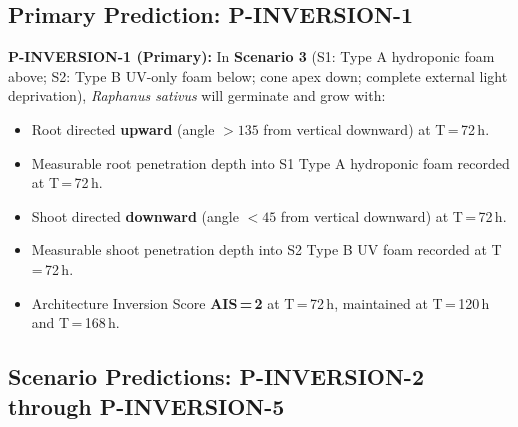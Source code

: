\documentclass[10pt, a4paper]{article}
\begin{document}
\subsection{Primary Prediction: P-INVERSION-1}

\begin{mdframed}[
  backgroundcolor=notebox,
  linecolor=rulecolor,
  linewidth=0.8pt,
  innertopmargin=0.5em,
  innerbottommargin=0.5em,
  innerleftmargin=0.8em,
  innerrightmargin=0.8em
]
\textbf{P-INVERSION-1 (Primary):}
In \textbf{Scenario 3} (S1: Type A hydroponic foam above;
S2: Type B UV-only foam below; cone apex down; complete
external light deprivation), \textit{Raphanus sativus}
will germinate and grow with:
\begin{itemize}[itemsep=0.1em, topsep=0.2em]
  \item Root directed \textbf{upward}
    (angle $>135$\textdegree{} from vertical downward)
    at T\,=\,72\,h.
  \item Measurable root penetration depth into S1
    Type A hydroponic foam recorded at T\,=\,72\,h.
  \item Shoot directed \textbf{downward}
    (angle $<45$\textdegree{} from vertical downward)
    at T\,=\,72\,h.
  \item Measurable shoot penetration depth into S2
    Type B UV foam recorded at T\,=\,72\,h.
  \item Architecture Inversion Score
    \textbf{AIS\,=\,2} at T\,=\,72\,h,
    maintained at T\,=\,120\,h and T\,=\,168\,h.
\end{itemize}
\end{mdframed}

\subsection{Scenario Predictions: P-INVERSION-2
through P-INVERSION-5}
\end{document}
